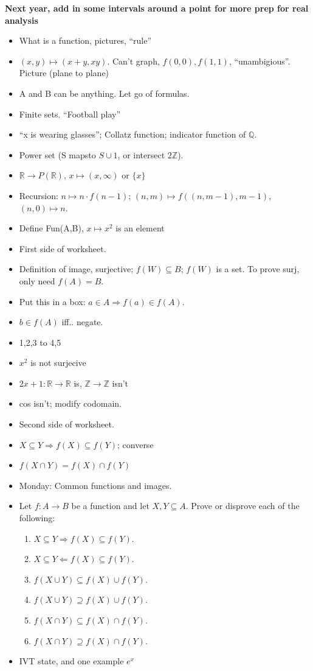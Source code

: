 \documentclass[12pt]{article}
\newcommand{\Z}{{\mathbb Z}}
\newcommand{\R}{{\mathbb R}}
\newcommand{\Q}{{\mathbb Q}}
\begin{document}
\textbf{Next year, add in some intervals around a point for more prep for real analysis}
\begin{itemize}
\item What is a function, pictures, ``rule''
\item $(x,y) \mapsto (x+y,xy)$. Can't graph, $f(0,0), f(1,1)$, ``unambigious''. Picture (plane to plane)
\item A and B can be anything. Let go of formulas.
\item Finite sets. ``Football play''
\item ``x is wearing glasses''; Collatz function; indicator function of $\Q$. 
\item Power set (S mapsto $S \cup {1}$, or intersect $2\Z$).
\item $\R \to P(\R)$, $x \mapsto (x,\infty)$ or $\{x\}$
\item Recursion: $n \mapsto n\cdot f(n-1)$; $(n,m) \mapsto f((n,m-1),m-1)$, $(n,0) \mapsto n$. 
\item Define Fun(A,B), $x \mapsto x^2$ is an element
\item First side of worksheet.
\end{itemize}
\begin{itemize}
\item Definition of image, surjective; $f(W) \subseteq B$; $f(W)$ is a set. To prove surj, only need $f(A) = B$.
\item Put this in a box: $a \in A \Rightarrow f(a) \in f(A)$. 
\item $b \in f(A)$ iff.. negate.
\item 1,2,3 to 4,5
\item $x^2$ is not surjecive
\item $2x+1\colon \R \to \R$ is, $\Z \to \Z$ isn't
\item cos isn't; modify codomain.
\item Second side of worksheet.
\item $X \subseteq Y \Rightarrow f(X) \subseteq f(Y)$; converse
\item $f(X\cap Y) = f(X) \cap f(Y)$
\item Monday: Common functions and images.
\item   Let $f\colon A \to B$ be a function and let $X,Y \subseteq A$. Prove
  or disprove each of the following:
  \begin{enumerate}
  \item $X \subseteq Y \Rightarrow f(X) \subseteq f(Y)$.
  \item $X \subseteq Y \Leftarrow f(X) \subseteq f(Y)$.
  \item $f(X \cup Y) \subseteq f(X) \cup f(Y)$.
  \item $f(X \cup Y) \supseteq f(X) \cup f(Y)$.
  \item $f(X \cap Y) \subseteq f(X) \cap f(Y)$.
  \item $f(X \cap Y) \supseteq f(X) \cap f(Y)$.
\end{enumerate}  
\item IVT state, and one example $e^x$
\end{itemize}
\end{document}
